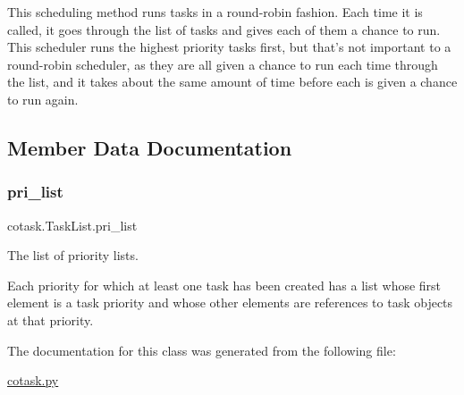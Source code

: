 \begin{DoxyVerb}This scheduling method runs tasks in a round-robin fashion. Each
time it is called, it goes through the list of tasks and gives each of
them a chance to run. This scheduler runs the highest priority tasks 
first, but that's not important to a round-robin scheduler, as they 
are all given a chance to run each time through the list, and it takes
about the same amount of time before each is given a chance to run 
again. \end{DoxyVerb}
 

\subsection{Member Data Documentation}
\mbox{\label{classcotask_1_1TaskList_aac6e53cb4fec80455198ff85c85a4b51}} 
\subsubsection{\texorpdfstring{pri\+\_\+list}{pri\_list}}
{\footnotesize\ttfamily cotask.\+Task\+List.\+pri\+\_\+list}



The list of priority lists. 

Each priority for which at least one task has been created has a list whose first element is a task priority and whose other elements are references to task objects at that priority. 

The documentation for this class was generated from the following file\+:\begin{DoxyCompactItemize}
\item 
\mbox{\hyperlink{cotask_8py}{cotask.\+py}}\end{DoxyCompactItemize}

